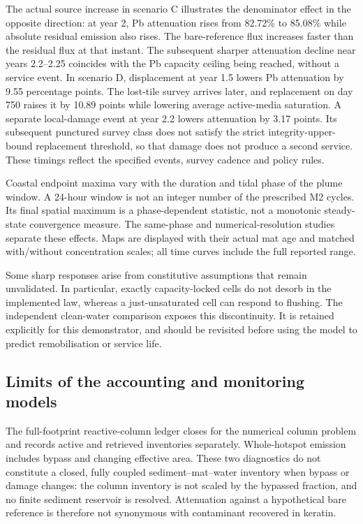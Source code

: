The actual source increase in scenario C illustrates the denominator effect in the opposite direction: at year 2, Pb attenuation rises from 82.72\% to 85.08\% while absolute residual emission also rises. The bare-reference flux increases faster than the residual flux at that instant. The subsequent sharper attenuation decline near years 2.2--2.25 coincides with the Pb capacity ceiling being reached, without a service event. In scenario D, displacement at year 1.5 lowers Pb attenuation by 9.55 percentage points. The lost-tile survey arrives later, and replacement on day 750 raises it by 10.89 points while lowering average active-media saturation. A separate local-damage event at year 2.2 lowers attenuation by 3.17 points. Its subsequent punctured survey class does not satisfy the strict integrity-upper-bound replacement threshold, so that damage does not produce a second service. These timings reflect the specified events, survey cadence and policy rules.

Coastal endpoint maxima vary with the duration and tidal phase of the plume window. A 24-hour window is not an integer number of the prescribed M2 cycles. Its final spatial maximum is a phase-dependent statistic, not a monotonic steady-state convergence measure. The same-phase and numerical-resolution studies separate these effects. Maps are displayed with their actual mat age and matched with/without concentration scales; all time curves include the full reported range.

Some sharp responses arise from constitutive assumptions that remain unvalidated. In particular, exactly capacity-locked cells do not desorb in the implemented law, whereas a just-unsaturated cell can respond to flushing. The independent clean-water comparison exposes this discontinuity. It is retained explicitly for this demonstrator, and should be revisited before using the model to predict remobilisation or service life.

\subsection{Limits of the accounting and monitoring models}
The full-footprint reactive-column ledger closes for the numerical column problem and records active and retrieved inventories separately. Whole-hotspot emission includes bypass and changing effective area. These two diagnostics do not constitute a closed, fully coupled sediment--mat--water inventory when bypass or damage changes: the column inventory is not scaled by the bypassed fraction, and no finite sediment reservoir is resolved. Attenuation against a hypothetical bare reference is therefore not synonymous with contaminant recovered in keratin.

